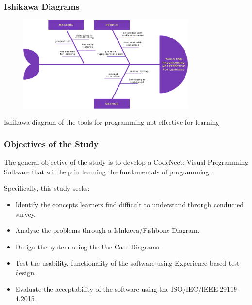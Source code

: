 \documentclass[handout]{beamer}
\newcommand{\parx}{
	\setlength{\parindent}{4em}
	\par}
\begin{document}
\begin{frame}
	\frametitle{Ishikawa Diagrams}
	\begin{figure}
		\includegraphics[width=0.8\textwidth]{figures/fishbone3.png}
	\end{figure}
	\centering
	Ishikawa diagram of the tools for programming not effective for learning
\end{frame}

\begin{frame}
	\frametitle{Objectives of the Study}
	\justifying
	\parx
	The general objective of the study is to develop a CodeNect: Visual Programming
	Software that will help in learning the fundamentals of programming.

	\parx
	Specifically, this study seeks:

	\begin{itemize}
		\item<1-> Identify the concepts learners find difficult to understand through conducted survey.
		\item<2-> Analyze the problems through a Ishikawa/Fishbone Diagram.
		\item<3-> Design the system using the Use Case Diagrams.
		\item<4-> Test the usability, functionality of the software using Experience-based test design.
		\item<5-> Evaluate the acceptability of the software using the ISO/IEC/IEEE 29119-4.2015.
	\end{itemize}
\end{frame}
\end{document}
